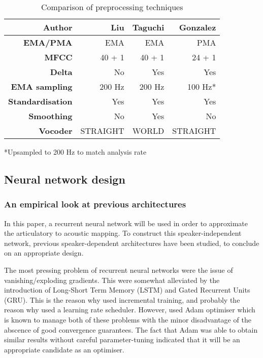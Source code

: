 \documentclass[a4paper]{article}
\begin{document}
\begin{table}[th]
  \caption{Comparison of preprocessing techniques}
  \label{tab:example}
  \centering
  \footnotesize
  \begin{tabular}{ r r r r }
    \toprule
    \textbf{Author} & \textbf{Liu} & \textbf{Taguchi} & \textbf{Gonzalez} \\
    \midrule
    \textbf{EMA/PMA} & EMA & EMA & PMA \\
    \textbf{MFCC} & 40 + 1 & 40 + 1 & 24 + 1 \\
    \textbf{Delta} & No & Yes & Yes \\
    \textbf{EMA sampling} & 200 Hz & 200 Hz & 100 Hz* \\
    \textbf{Standardisation} & Yes & Yes & Yes \\
    \textbf{Smoothing} & No & Yes  & No \\
    \textbf{Vocoder} & STRAIGHT \cite{Kawahara2006} & WORLD  & STRAIGHT \\
    \bottomrule
  \end{tabular}
  *Upsampled to 200 Hz to match analysis rate
\end{table}

\subsection{Neural network design} \label{section:nnexperiment}

\subsubsection{An empirical look at previous architectures}

In this paper, a recurrent neural network will be used in order to
approximate the articulatory to acoustic mapping. To construct
this speaker-independent network, previous speaker-dependent architectures
have been studied, to conclude on an appropriate design.

The most pressing problem of recurrent neural networks were the issue
of vanishing/exploding gradients. This were somewhat alleviated by the
introduction of Long-Short Term Memory (LSTM) and Gated Recurrent Units (GRU).
This is the reason why \cite{Taguchi} used incremental
training, and probably the reason why \cite{Liu2018} used a learning rate
scheduler. However, \cite{Gonzalez2017} used Adam optimiser \cite{Kingma2015}
which is known to manage both of these problems with the minor disadvantage of
the abscence of good convergence guarantees. The fact that Adam was able
to obtain similar results without careful parameter-tuning indicated that
it will be an appropriate candidate as an optimiser. 
\end{document}
